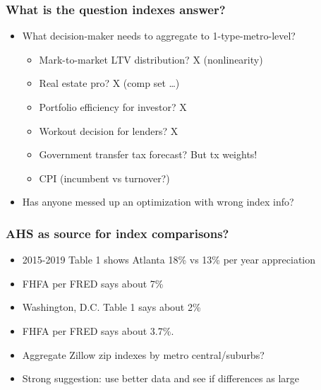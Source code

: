 \documentclass{beamer}
\begin{document}
\begin{frame}
	\frametitle{What is the question indexes answer?}
	\begin{itemize}
		\item What decision-maker needs to aggregate to 1-type-metro-level?
			\begin{itemize}
				\item Mark-to-market LTV distribution? X (nonlinearity)
				\item Real estate pro? X (comp set \dots)
				\item Portfolio efficiency for investor? X
				\item Workout decision for lenders? X
				\item Government transfer tax forecast? But tx weights!
				\item CPI (incumbent vs turnover?)
			\end{itemize}
		\item Has anyone messed up an optimization with wrong index info?
	\end{itemize}
\end{frame}
\begin{frame}
	\frametitle{AHS as source for index comparisons? }
	\begin{itemize}
		\item 2015-2019 Table 1 shows Atlanta 18\% vs 13\% per year appreciation
		\item FHFA per FRED says about 7\%
		\item Washington, D.C. Table 1 says about 2\%
		\item FHFA per FRED says about 3.7\%.
		\item Aggregate Zillow zip indexes by metro central/suburbs?
		\item Strong suggestion: use better data and see if differences as large
	\end{itemize}
\end{frame}
\end{document}
